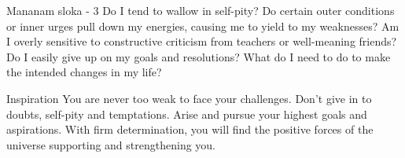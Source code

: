 \newpage
\begin{mananam}{\mananamfont Mananam sloka - 3}
\mananamtext Do I tend to wallow in self-pity? Do certain outer conditions or inner urges pull down my energies, causing me to yield to my weaknesses? Am I overly sensitive to constructive criticism from teachers or well-meaning friends?
Do I easily give up on my goals and resolutions? What do I need to do to make the intended changes in my life? 
\end{mananam}
\WritingHand{}
\begin{inspiration}{\mananamfont Inspiration}
\mananamtext You are never too weak to face your challenges. Don’t give in to doubts, self-pity and temptations. Arise and pursue your highest goals and aspirations. With firm determination, you will find the positive forces of the universe supporting and strengthening you.
\end{inspiration}
\newpage

